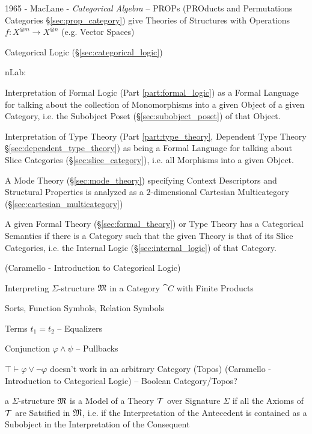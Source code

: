 1965 - MacLane - \emph{Categorical Algebra} -- PROPs (PROducts and Permutations
Categories \S\ref{sec:prop_category}) give Theories of Structures with
Operations $f : X^{\otimes m} \rightarrow X^{\otimes n}$ (e.g. Vector Spaces)

\fist Categorical Logic (\S\ref{sec:categorical_logic})

nLab:

Interpretation of Formal Logic (Part \ref{part:formal_logic}) as a
Formal Language for talking about the collection of Monomorphisms into
a given Object of a given Category, i.e. the Subobject Poset
(\S\ref{sec:subobject_poset}) of that Object.

Interpretation of Type Theory (Part \ref{part:type_theory}, Dependent
Type Theory \S\ref{sec:dependent_type_theory}) as being a Formal
Language for talking about Slice Categories
(\S\ref{sec:slice_category}), i.e. all Morphisms into a given Object.

A Mode Theory (\S\ref{sec:mode_theory}) specifying Context Descriptors
and Structural Properties is analyzed as a $2$-dimensional Cartesian
Multicategory (\S\ref{sec:cartesian_multicategory})

A given Formal Theory (\S\ref{sec:formal_theory}) or Type Theory has a
Categorical Semantics if there is a Category such that the given
Theory is that of its Slice Categories, i.e. the Internal Logic
(\S\ref{sec:internal_logic}) of that Category.


\asterism


(Caramello - Introduction to Categorical Logic) %

Interpreting $\Sigma$-structure $\mathfrak{M}$ in a Category $\cat{C}$
with Finite Products

Sorts, Function Symbols, Relation Symbols

Terms $t_1 = t_2$ -- Equalizers

Conjunction $\varphi \wedge \psi$ -- Pullbacks

$\top \vdash \varphi \vee \neg\varphi$ doesn't work in an arbitrary
Category (Topos) (Caramello - Introduction to Categorical Logic) --
Boolean Category/Topos?

a $\Sigma$-structure $\mathfrak{M}$ is a Model of a Theory $\mathcal{T}$
over Signature $\Sigma$ if all the Axioms of $\mathcal{T}$ are Satsified
in $\mathfrak{M}$, i.e. if the Interpretation of the Antecedent is
contained as a Subobject in the Interpretation of the Consequent


